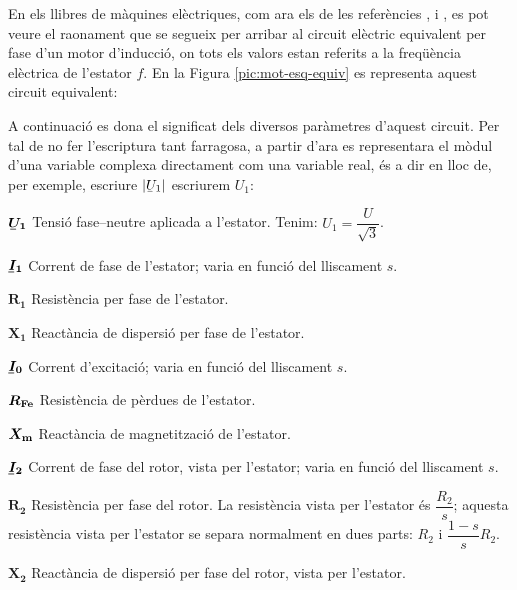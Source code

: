 En els llibres de màquines elèctriques, com ara els de les referències \cite{CHA}, \cite{FIT} i \cite{JFM}, es pot veure el raonament que se segueix per arribar al circuit elèctric equivalent per fase d'un motor d'inducció, on tots els valors estan referits a la freqüència elèctrica de l'estator $f$. En la Figura \vref{pic:mot-esq-equiv} es representa aquest circuit equivalent:

\begin{center}
    
    \label{pic:mot-esq-equiv}
\end{center}

A continuació es dona el significat dels diversos paràmetres d'aquest circuit. Per tal de no fer l'escriptura tant farragosa, a partir d'ara es representara el mòdul d'una variable complexa  directament com una variable real, és a dir en lloc de, per exemple, escriure $|\cmplx{U}_1|$ escriurem $U_1$:

\begin{list}{}
   {\setlength{\labelwidth}{12mm} \setlength{\leftmargin}{12mm} \setlength{\labelsep}{2mm}}
   \item[$\boldsymbol{\cmplx{U}_1}$] Tensió fase--neutre aplicada a l'estator. Tenim: $U_1 = \dfrac{U}{\sqrt{3}}$.
   \item[$\boldsymbol{\cmplx{I}_1}$] Corrent de fase de l'estator; varia en funció del lliscament $s$.
   \item[$\boldsymbol{R_1}$] Resistència per fase de l'estator.
   \item[$\boldsymbol{X_1}$] Reactància de dispersió per fase de l'estator.
   \item[$\boldsymbol{\cmplx{I}_0}$] Corrent d'excitació; varia en funció del lliscament $s$.
   \item[$\boldsymbol{R_\mathrm{Fe}}$] Resistència de pèrdues de l'estator.
   \item[$\boldsymbol{X_\mathrm{m}}$] Reactància de magnetització de l'estator.
   \item[$\boldsymbol{\cmplx{I}_2}$] Corrent de fase del rotor, vista per l'estator; varia en funció del lliscament $s$.
   \item[$\boldsymbol{R_2}$] Resistència per fase del rotor. La resistència vista per l'estator és $\dfrac{R_2}{s}$; aquesta resistència vista per l'estator se separa normalment en dues parts: $R_2$ i $\dfrac{1-s}{s} R_2$.
   \item[$\boldsymbol{X_2}$] Reactància de dispersió per fase del rotor, vista per l'estator.
\end{list}

